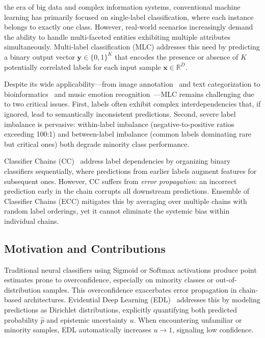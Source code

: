 \documentclass[conference]{IEEEtran}
\begin{document}
 the era of big data and complex information systems, conventional machine learning has primarily focused on single-label classification, where each instance belongs to exactly one class. However, real-world scenarios increasingly demand the ability to handle multi-faceted entities exhibiting multiple attributes simultaneously. Multi-label classification (MLC) addresses this need by predicting a binary output vector $\mathbf{y} \in \{0, 1\}^K$ that encodes the presence or absence of $K$ potentially correlated labels for each input sample $\mathbf{x} \in \mathbb{R}^D$.

Despite its wide applicability—from image annotation~\cite{boutell2004learning} and text categorization to bioinformatics~\cite{chou2001prediction} and music emotion recognition~\cite{trohidis2008multilabel}—MLC remains challenging due to two critical issues. First, labels often exhibit complex interdependencies that, if ignored, lead to semantically inconsistent predictions. Second, severe label imbalance is pervasive: within-label imbalance (negative-to-positive ratios exceeding 100:1) and between-label imbalance (common labels dominating rare but critical ones) both degrade minority class performance.

Classifier Chains (CC)~\cite{read2011classifier} address label dependencies by organizing binary classifiers sequentially, where predictions from earlier labels augment features for subsequent ones. However, CC suffers from \textit{error propagation}: an incorrect prediction early in the chain corrupts all downstream predictions. Ensemble of Classifier Chains (ECC) mitigates this by averaging over multiple chains with random label orderings, yet it cannot eliminate the systemic bias within individual chains.

\subsection{Motivation and Contributions}

Traditional neural classifiers using Sigmoid or Softmax activations produce point estimates prone to overconfidence, especially on minority classes or out-of-distribution samples. This overconfidence exacerbates error propagation in chain-based architectures. Evidential Deep Learning (EDL)~\cite{sensoy2018evidential} addresses this by modeling predictions as Dirichlet distributions, explicitly quantifying both predicted probability $\hat{p}$ and epistemic uncertainty $u$. When encountering unfamiliar or minority samples, EDL automatically increases $u \to 1$, signaling low confidence.
\end{document}
